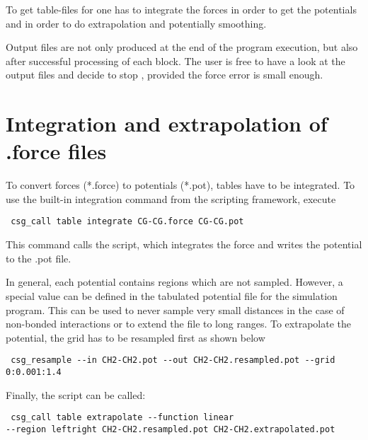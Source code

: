 To get table-files for \gromacs one has to integrate the forces in order to get the potentials and in order to do extrapolation and potentially smoothing.

Output files are not only produced at the end of the program execution, but also after successful processing of each block. The user is free to have a look at the output files and decide to stop , provided the force error is small enough.

\section{Integration and extrapolation of .force files }
To convert forces (*.force) to potentials (*.pot), tables have to be integrated. To use the built-in integration command from the scripting framework, execute
\begin{verbatim}
 csg_call table integrate CG-CG.force CG-CG.pot
\end{verbatim}

This command calls the  script, which integrates the force and writes the potential to the .pot file.

In general, each potential contains regions which are not sampled. However, a special value can be defined in the tabulated potential file for the simulation program. This can be used to never sample very small distances in the case of non-bonded interactions or to extend the file to long ranges. To extrapolate the potential, the grid has to be resampled first as shown below
\begin{verbatim}
 csg_resample --in CH2-CH2.pot --out CH2-CH2.resampled.pot --grid 0:0.001:1.4
\end{verbatim}

Finally, the  script can be called:
\begin{verbatim}
 csg_call table extrapolate --function linear
--region leftright CH2-CH2.resampled.pot CH2-CH2.extrapolated.pot
\end{verbatim}
